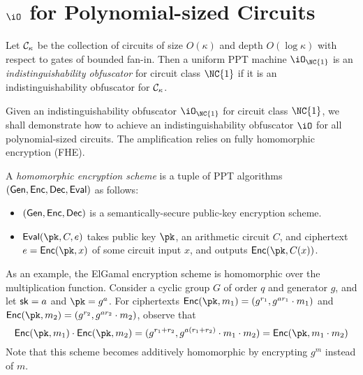 \newcommand{\cO}{\ensuremath{\mathcal{O}}}

\section{$\iO$ for Polynomial-sized Circuits}


\begin{definition}
Let $\mathcal{C}_\kappa$ be the collection of circuits of size $O(\kappa)$ and depth
$O(\log{\kappa})$ with respect to gates of bounded fan-in.
Then a uniform PPT machine $\iO_{\NC{1}}$ is an
\emph{indistinguishability obfuscator} for circuit class $\NC{1}$ if it
is an indistinguishability obfuscator for $\mathcal{C}_\kappa$.
\end{definition}

Given an indistinguishability obfuscator $\iO_{\NC{1}}$ for circuit
class $\NC{1}$, we shall demonstrate how to achieve an
indistinguishability obfuscator $\iO$ for all polynomial-sized circuits.
The amplification relies on fully homomorphic encryption (FHE).

\newcommand{\GEN}{\ensuremath{\mathsf{Gen}}}

\begin{definition}
A \emph{homomorphic encryption scheme} is a tuple of PPT algorithms
$(\GEN, \Enc, \Dec, \Eval)$ as follows:
\begin{itemize}
\item
	$(\GEN, \Enc, \Dec)$ is a semantically-secure public-key
	encryption scheme.
\item
	$\Eval(\pk, C, e)$ takes public key $\pk$, an arithmetic circuit
	$C$, and ciphertext $e = \Enc(\pk, x)$ of some circuit input
	$x$, and outputs $\Enc(\pk, C(x))$.
\end{itemize}
\end{definition}

As an example, the ElGamal encryption scheme is homomorphic over the multiplication function.
Consider a cyclic group $G$ of order $q$ and generator $g$, and let
$\mathsf{sk} = a$ and $\pk = g^a$.
For ciphertexts $\Enc(\pk, m_1) = (g^{r_1}, g^{a r_1} \cdot m_1)$
and $\Enc(\pk, m_2) = (g^{r_2}, g^{a r_2} \cdot m_2)$, observe that
\begin{equation*}
\Enc(\pk, m_1) \cdot \Enc(\pk, m_2) = (g^{r_1 + r_2}, g^{a (r_1 + r_2)}
\cdot m_1 \cdot m_2) = \Enc(\pk, m_1 \cdot m_2)
\end{equation*}
Note that this scheme becomes additively homomorphic by encrypting $g^m$
instead of $m$.

